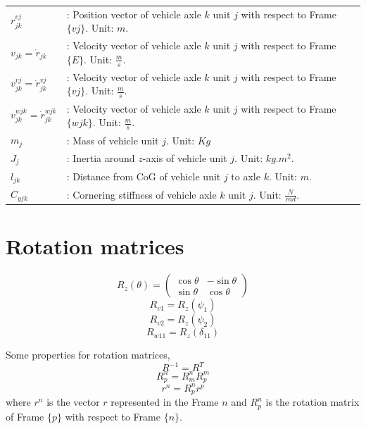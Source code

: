 \documentclass[12pt]{article}
\begin{document}
\begin{table}[H]
\begin{tabular}{p{4cm} p{10cm}}
$r_{jk}^{vj}$ &: Position vector of vehicle axle $k$ unit $j$ with respect to Frame $\{ vj\}$. Unit: $m$.\\
$v_{jk} = \dot{r}_{jk}$ &: Velocity vector of vehicle axle $k$ unit $j$ with respect to Frame $\{ E\}$. Unit: $ \displaystyle \frac{m}{s}$.\\
$v_{jk}^{vj} = \dot{r}_{jk}^{vj}$ &: Velocity vector of vehicle axle $k$ unit $j$ with respect to Frame $\{ vj\}$. Unit: $ \displaystyle \frac{m}{s}$.\\
$v_{jk}^{wjk} = \dot{r}_{jk}^{wjk}$ &: Velocity vector of vehicle axle $k$ unit $j$ with respect to Frame $\{ wjk\}$. Unit: $ \displaystyle \frac{m}{s}$. \\
$m_j$ &: Mass of vehicle unit $j$. Unit: $Kg$\\
$J_j$ &: Inertia around $z$-axis of vehicle unit $j$. Unit: $ kg.m^2$.\\
$l_{jk}$ &: Distance from CoG of vehicle unit $j$ to axle $k$. Unit: $m$.\\
$C_{yjk}$ &: Cornering stiffness of vehicle axle $k$ unit $j$. Unit: $ \displaystyle \frac{N}{rad}$.\\

\end{tabular}
\end{table}


\section{Rotation matrices}
\begin{equation}
    R_z (\theta) = \begin{pmatrix} \cos{\theta} & - \sin{\theta} \\ \sin{\theta} & \cos{\theta} \end{pmatrix}
\end{equation}
\begin{equation}
    R_{v1} = R_z (\psi_1)
\end{equation}
\begin{equation}
    R_{v2} = R_z (\psi_2)
\end{equation}
\begin{equation}
    R_{w11} = R_z (\delta_{11})
\end{equation}


Some properties for rotation matrices,
\begin{equation}
R^{-1} = R^T    
\end{equation}
\begin{equation}
R^{n}_{p} = R^{n}_m R^{m}_p     
\end{equation}
\begin{equation}
    r^n = R^n_p r^p
\end{equation}
where $r^n$ is the vector $r$ represented in the Frame ${n}$ and $R^n_p$ is the rotation matrix of Frame $\{ p \}$ with respect to Frame $\{ n \}$.
\end{document}
